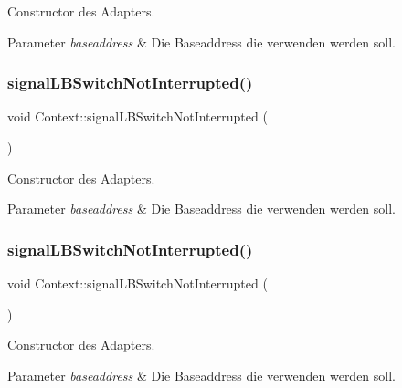 Constructor des Adapters.


\begin{DoxyParams}{Parameter}
{\em baseaddress} & Die Baseaddress die verwenden werden soll. \\
\hline
\end{DoxyParams}
\hypertarget{class_context_a4fd603eec47acc8a3671b7bdd3bdfe6d}{}\label{class_context_a4fd603eec47acc8a3671b7bdd3bdfe6d} 
\subsubsection{\texorpdfstring{signal\+L\+B\+Switch\+Not\+Interrupted()}{signalLBSwitchNotInterrupted()}\hspace{0.1cm}{\footnotesize\ttfamily [1/2]}}
{\footnotesize\ttfamily void Context\+::signal\+L\+B\+Switch\+Not\+Interrupted (\begin{DoxyParamCaption}{ }\end{DoxyParamCaption})}

Constructor des Adapters.


\begin{DoxyParams}{Parameter}
{\em baseaddress} & Die Baseaddress die verwenden werden soll. \\
\hline
\end{DoxyParams}
\hypertarget{class_context_a4fd603eec47acc8a3671b7bdd3bdfe6d}{}\label{class_context_a4fd603eec47acc8a3671b7bdd3bdfe6d} 
\subsubsection{\texorpdfstring{signal\+L\+B\+Switch\+Not\+Interrupted()}{signalLBSwitchNotInterrupted()}\hspace{0.1cm}{\footnotesize\ttfamily [2/2]}}
{\footnotesize\ttfamily void Context\+::signal\+L\+B\+Switch\+Not\+Interrupted (\begin{DoxyParamCaption}{ }\end{DoxyParamCaption})}

Constructor des Adapters.


\begin{DoxyParams}{Parameter}
{\em baseaddress} & Die Baseaddress die verwenden werden soll. \\
\hline
\end{DoxyParams}
\hypertarget{class_context_a59ea683658907374dbe23125c11b1e93}{}\label{class_context_a59ea683658907374dbe23125c11b1e93} 
